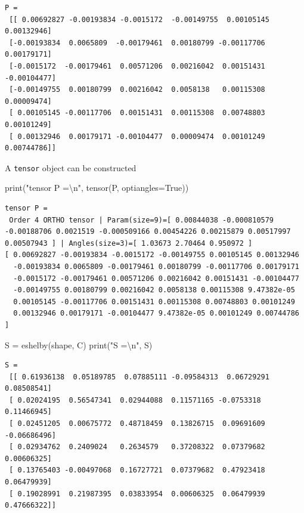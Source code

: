 \documentclass[
  letterpaper,
  DIV=11,
  numbers=noendperiod]{scrreprt}
\newenvironment{Shaded}{\begin{snugshade}}{\end{snugshade}}
\newcommand{\BuiltInTok}[1]{\textcolor[rgb]{0.00,0.23,0.31}{#1}}
\newcommand{\CharTok}[1]{\textcolor[rgb]{0.13,0.47,0.30}{#1}}
\newcommand{\NormalTok}[1]{\textcolor[rgb]{0.00,0.23,0.31}{#1}}
\newcommand{\OperatorTok}[1]{\textcolor[rgb]{0.37,0.37,0.37}{#1}}
\newcommand{\StringTok}[1]{\textcolor[rgb]{0.13,0.47,0.30}{#1}}
\newcommand{\VariableTok}[1]{\textcolor[rgb]{0.07,0.07,0.07}{#1}}
\begin{document}
\begin{verbatim}
P =
 [[ 0.00692827 -0.00193834 -0.0015172  -0.00149755  0.00105145  0.00132946]
 [-0.00193834  0.0065809  -0.00179461  0.00180799 -0.00117706  0.00179171]
 [-0.0015172  -0.00179461  0.00571206  0.00216042  0.00151431 -0.00104477]
 [-0.00149755  0.00180799  0.00216042  0.0058138   0.00115308  0.00009474]
 [ 0.00105145 -0.00117706  0.00151431  0.00115308  0.00748803  0.00101249]
 [ 0.00132946  0.00179171 -0.00104477  0.00009474  0.00101249  0.00744786]]
\end{verbatim}

A \texttt{tensor} object can be constructed

\begin{Shaded}
\begin{Highlighting}[]
\BuiltInTok{print}\NormalTok{(}\StringTok{"tensor P =}\CharTok{\textbackslash{}n}\StringTok{"}\NormalTok{, tensor(P, optiangles}\OperatorTok{=}\VariableTok{True}\NormalTok{))}
\end{Highlighting}
\end{Shaded}

\begin{verbatim}
tensor P =
 Order 4 ORTHO tensor | Param(size=9)=[ 0.00844038 -0.000810579 -0.00188706 0.0021519 -0.000509166 0.00454226 0.00215879 0.00517997 0.00507943 ] | Angles(size=3)=[ 1.03673 2.70464 0.950972 ]
[ 0.00692827 -0.00193834 -0.0015172 -0.00149755 0.00105145 0.00132946 
  -0.00193834 0.0065809 -0.00179461 0.00180799 -0.00117706 0.00179171 
  -0.0015172 -0.00179461 0.00571206 0.00216042 0.00151431 -0.00104477 
  -0.00149755 0.00180799 0.00216042 0.0058138 0.00115308 9.47382e-05 
  0.00105145 -0.00117706 0.00151431 0.00115308 0.00748803 0.00101249 
  0.00132946 0.00179171 -0.00104477 9.47382e-05 0.00101249 0.00744786 ]
\end{verbatim}

\begin{Shaded}
\begin{Highlighting}[]
\NormalTok{S }\OperatorTok{=}\NormalTok{ eshelby(shape, C)}
\BuiltInTok{print}\NormalTok{(}\StringTok{"S =}\CharTok{\textbackslash{}n}\StringTok{"}\NormalTok{, S)}
\end{Highlighting}
\end{Shaded}

\begin{verbatim}
S =
 [[ 0.61936138  0.05189785  0.07885111 -0.09584313  0.06729291  0.08508541]
 [ 0.02024195  0.56547341  0.02944088  0.11571165 -0.0753318   0.11466945]
 [ 0.02451205  0.00675772  0.48718459  0.13826715  0.09691609 -0.06686496]
 [ 0.02934762  0.2409024   0.2634579   0.37208322  0.07379682  0.00606325]
 [ 0.13765403 -0.00497068  0.16727721  0.07379682  0.47923418  0.06479939]
 [ 0.19028991  0.21987395  0.03833954  0.00606325  0.06479939  0.47666322]]
\end{verbatim}
\end{document}
